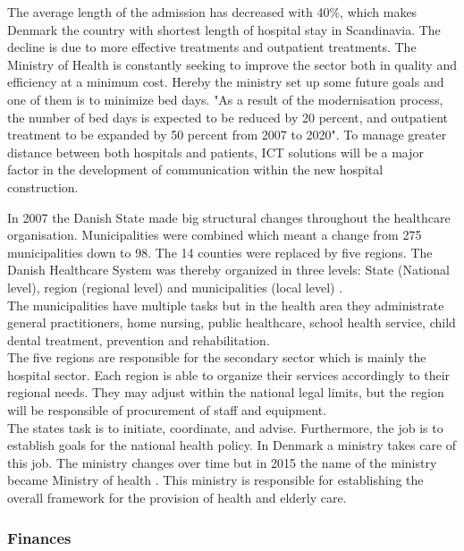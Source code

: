 The average length of the admission has decreased with 40\%, which makes Denmark the country with shortest length of hospital stay in Scandinavia. The decline is due to more effective treatments and outpatient treatments. The Ministry of Health is constantly seeking to improve the sector both in quality and efficiency at a minimum cost. Hereby the ministry set up some future goals and one of them is to minimize bed days. "As a result of the modernisation process, the number of bed days is expected to be reduced by 20 percent, and outpatient treatment to be expanded by 50 percent from 2007 to 2020". To manage greater distance between both hospitals and patients, ICT solutions will be a major factor in the development of communication within the new hospital construction\cite{DKhealthreview, Healthcareindk2}. 

In 2007 the Danish State made big structural changes throughout the healthcare organisation. Municipalities were combined which meant a change from 275 municipalities down to 98. The 14 counties were replaced by five regions. The Danish Healthcare System was thereby organized in three levels: State (National level), region (regional level) and municipalities (local level) \cite{indenrigs, Healthcareindk2}.\\
The municipalities have multiple tasks but in the health area they administrate general practitioners, home nursing, public healthcare, school health service, child dental treatment, prevention and rehabilitation\cite{sundhedsministeriet}. \\
The five regions are responsible for the secondary sector which is mainly the hospital sector. Each region is able to organize their services accordingly to their regional needs. They may adjust within the national legal limits, but the region will be responsible of procurement of staff and equipment.\\
The states task is to initiate, coordinate, and advise. Furthermore, the job is to establish goals for the national health policy\cite{sundhedsministeriet}. In Denmark a ministry takes care of this job. The ministry changes over time but in 2015 the name of the ministry became Ministry of health \cite{ministryofhealth}. This ministry is responsible for establishing the overall framework for the provision of health and elderly care.


\subsubsection{Finances}

